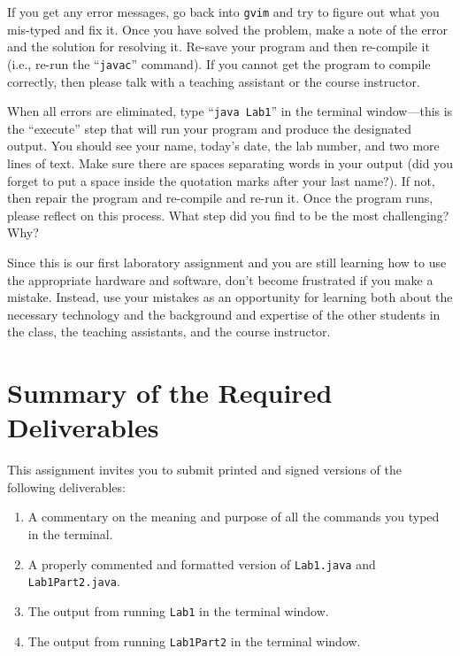 \documentclass[11pt]{article}
\newcommand{\command}[1]{``\lstinline{#1}''}
\begin{document}
If you get any error messages, go back into {\tt gvim} and try to figure out what you mis-typed and fix it. Once you
have solved the problem, make a note of the error and the solution for resolving it. Re-save your program and then
re-compile it (i.e., re-run the \command{javac} command). If you cannot get the program to compile correctly, then
please talk with a teaching assistant or the course instructor.

When all errors are eliminated, type \command{java Lab1} in the terminal window---this is the ``execute'' step that will
run your program and produce the designated output.  You should see your name, today's date, the lab number, and two
more lines of text. Make sure there are spaces separating words in your output (did you forget to put a space inside the
quotation marks after your last name?). If not, then repair the program and re-compile and re-run it.  Once the program
runs, please reflect on this process.  What step did you find to be the most challenging? Why?

Since this is our first laboratory assignment and you are still learning how to use the appropriate hardware and
software, don't become frustrated if you make a mistake. Instead, use your mistakes as an opportunity for learning both
about the necessary technology and the background and expertise of the other students in the class, the teaching
assistants, and the course instructor.

\section*{Summary of the Required Deliverables}

This assignment invites you to submit printed and signed versions of the following deliverables:

\vspace*{-.1in}
\begin{enumerate}
  \setlength{\itemsep}{0in}
\item A commentary on the meaning and purpose of all the commands you typed in the terminal.
\item A properly commented and formatted version of {\tt Lab1.java} and {\tt Lab1Part2.java}.
\item The output from running {\tt Lab1} in the terminal window.
\item The output from running {\tt Lab1Part2} in the terminal window.
\end{enumerate}
\vspace*{-.1in}
\end{document}
